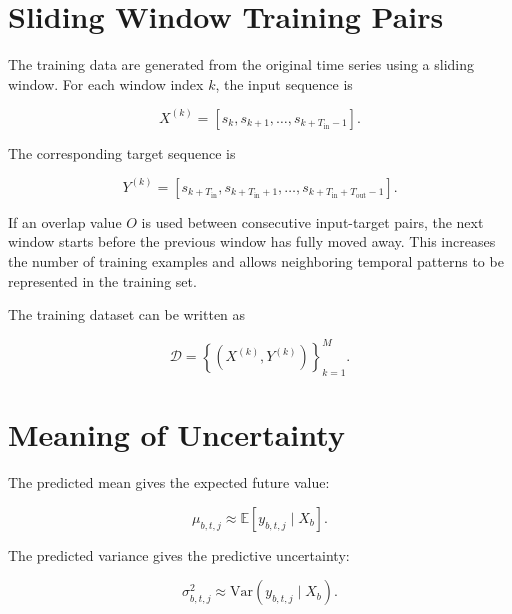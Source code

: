 \documentclass[a4paper]{article}
\begin{document}
    
    \section{Sliding Window Training Pairs}
        
        The training data are generated from the original time series using a sliding window. For each window index \(k\), the input sequence is
        
        \[
            X^{(k)}
            =
            \left[
                s_k,
                s_{k+1},
                \ldots,
            s_{k+T_{\mathrm{in}}-1}
            \right].
        \]
        
        The corresponding target sequence is
        
        \[
            Y^{(k)}
            =
            \left[
                s_{k+T_{\mathrm{in}}},
            s_{k+T_{\mathrm{in}}+1},
                \ldots,
            s_{k+T_{\mathrm{in}}+T_{\mathrm{out}}-1}
            \right].
        \]
        
        If an overlap value \(O\) is used between consecutive input-target pairs, the next window starts before the previous window has fully moved away. This increases the number of training examples and allows neighboring temporal patterns to be represented in the training set.
        
        The training dataset can be written as
        
        \[
            \mathcal{D}
            =
            \left\{
                \left(
                    X^{(k)},
                Y^{(k)}
                \right)
            \right\}_{k=1}^{M}.
        \]
    
    
    \section{Meaning of Uncertainty}
        
        The predicted mean gives the expected future value:
        
        \[
            \mu_{b,t,j}
            \approx
            \mathbb{E}
            \left[
                y_{b,t,j}
                \mid
                X_b
            \right].
        \]
        
        The predicted variance gives the predictive uncertainty:
        
        \[
            \sigma^2_{b,t,j}
            \approx
            \mathrm{Var}
            \left(
                y_{b,t,j}
                \mid
                X_b
            \right).
        \]
        
\end{document}
